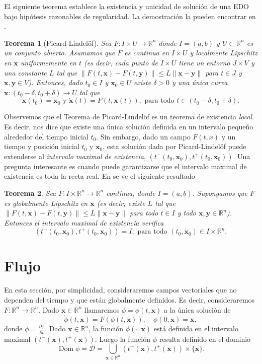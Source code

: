 \documentclass[12pt, a4paper]{amsbook}
\def\Dom{\operatorname {\mathrm{Dom}}}
\newcommand{\R}{{\mathbb R}}
\newcommand{\D}{{\mathcal D}}
\newcommand{\xx}{{\mathbf x}}
\newcommand{\yy}{{\mathbf y}}
\newtheorem{teo}{Teorema}[section]
\theoremstyle{remark}
\theoremstyle{definition}
\numberwithin{section}{chapter}
\numberwithin{subsection}{section}
\numberwithin{equation}{section}
\numberwithin{figure}{chapter}
\begin{document}
El siguiente teorema establece la existencia y unicidad de solución de una EDO bajo hipótesis razonables de regularidad. La demostración la pueden encontrar en \cite{Wolanski}.
\begin{teo}[Picard-Lindel\"of]
Sea $F\colon I\times U\to \R^n$ donde $I=(a, b)$ y $U\subset \R^n$ es un conjunto abierto. Asumamos que $F$ es continua en $I\times U$ y localmente Lipschitz en $\xx$ uniformemente en $t$ (es decir, cada punto de $I\times U$ tiene un entorno $J\times V$ y una constante $L$ tal que $\|F(t,\xx)-F(t,\yy)\|\le L\|\xx-\yy\|$ para $t\in J$ y $\xx,\yy\in V$). Entonces, dado $t_0\in I$ y $\xx_0\in U$ existe $\delta>0$ y una única curva $\xx\colon (t_0-\delta, t_0+\delta)\to U$ tal que
$$
\xx(t_0) = \xx_0 \text{ y } \dot \xx(t) = F(t, \xx(t)), \text{ para todo } t\in (t_0-\delta, t_0+\delta).
$$
\end{teo}

Observemos que el Teorema de Picard-Lindel\"of es un teorema de existencia {\em local}. Es decir, nos dice que existe una única solución definida en un intervalo pequeño alrededor del tiempo inicial $t_0$. Sin embargo, dado un campo $F(t, x)$ y un tiempo y posición inicial $t_0$ y $\xx_0$, esta solución dada por Picard-Lindel\"of puede extenderse al {\em intervalo maximal de existencia}, $(t^-(t_0,\xx_0), t^+(t_0, \xx_0))$. Una pregunta interesante es cuando puede garantizarse que el intervalo maximal de existencia es toda la recta real. En \cite{Wolanski} se ve el siguiente resultado
\begin{teo}\label{global}
Sea $F\colon I\times \R^n\to \R^n$ continua, donde $I=(a, b)$. Supongamos que $F$ es {\em globalmente} Lipschitz en $\xx$ (es decir, existe $L$ tal que $\|F(t,\xx)-F(t,\yy)\|\le L\|\xx-\yy\|$ para todo $t\in I$ y todo $\xx,\yy\in\R^n$). Entonces el intervalo maximal de existencia verifica
$$
(t^-(t_0,\xx_0), t^+(t_0, \xx_0)) = I, \text{ para todo } (t_0, \xx_0)\in I\times \R^n.
$$
\end{teo}

\section{Flujo}

En esta sección, por simplicidad, consideraremos campos vectoriales que no dependen del tiempo y que están globalmente definidos. Es decir, consideraremos $F\colon \R^n\to\R^n$. Dado $\xx\in\R^n$ llamaremos $\phi = \phi(t, \xx)$ a la única solución de
$$
\dot \phi(t, \xx) = F(\phi(t, \xx)),\quad \phi(0,\xx) = \xx,
$$
donde $\dot\phi = \frac{\partial\phi}{\partial t}$. Dado $\xx\in\R^n$, la función $\phi(\cdot,\xx)$ está definida en el intervalo maximal $(t^-(\xx), t^+(\xx))$. Luego la función $\phi$ resulta definido en el dominio
$$
\Dom \phi = \D = \bigcup_{\xx\in\R^n} (t^-(\xx), t^+(\xx))\times \{\xx\}.
$$
\end{document}
